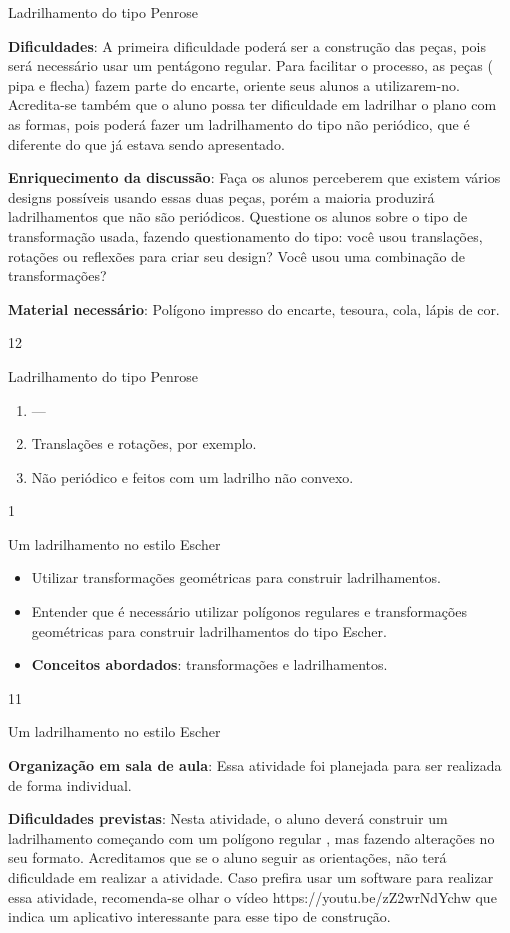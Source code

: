 {\begin{sugestions}{Ladrilhamento do tipo Penrose}
{	\textbf{Dificuldades}: A primeira dificuldade poderá ser a construção das peças, pois será necessário usar um pentágono regular. Para facilitar o processo,  as peças ( pipa e flecha) fazem parte do encarte, oriente seus alunos a utilizarem-no. Acredita-se também que o aluno possa ter dificuldade em ladrilhar o plano com as formas, pois poderá fazer um ladrilhamento do tipo não periódico, que é diferente do que já estava sendo apresentado. 

	\textbf{Enriquecimento da discussão}: Faça os alunos perceberem  que existem vários designs possíveis usando essas duas peças, porém a maioria produzirá ladrilhamentos que não são periódicos. Questione os alunos sobre o tipo de transformação usada, fazendo questionamento do tipo: você usou translações, rotações ou reflexões para criar seu design? Você usou uma combinação de transformações? 

	\textbf{Material necessário}: Polígono impresso do encarte, tesoura, cola, lápis de cor.
}{1}{2}
\end{sugestions}
\begin{answer}{Ladrilhamento do tipo Penrose}
{
	\begin{enumerate}
	\item ---
	\item Translações e rotações, por exemplo.
	\item Não periódico e feitos com um ladrilho não convexo.
	\end{enumerate}
}{1}
\end{answer}
\clearmargin
\begin{objectives}{Um ladrilhamento no estilo Escher}
{
	\begin{itemize}
	\item Utilizar transformações geométricas para construir ladrilhamentos.
	\item Entender que é necessário utilizar polígonos regulares e transformações geométricas para construir ladrilhamentos do tipo Escher.
	\item \textbf{Conceitos abordados}: transformações e ladrilhamentos.
	\end{itemize}
}{1}{1}
\end{objectives}
\begin{sugestions}{Um ladrilhamento no estilo Escher}
{
	\textbf{Organização em sala de aula}: Essa atividade foi planejada para ser realizada de forma individual. 

	\textbf{Dificuldades previstas}: Nesta atividade, o aluno deverá construir um  ladrilhamento começando com um polígono regular , mas fazendo alterações no seu formato.  Acreditamos que se o aluno seguir as orientações, não terá dificuldade em realizar a atividade. Caso prefira usar um software para realizar essa atividade, recomenda-se olhar o vídeo https://youtu.be/zZ2wrNdYchw que indica um aplicativo interessante para esse tipo de construção.  

}
\end{sugestions}}
